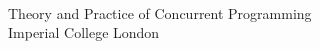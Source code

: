 
\begin{titlepage}


    \begin{flushright}
         \\
        \vspace{4mm}
        \moduletitlefont Theory and Practice of Concurrent Programming \\
        \vspace{1mm}
        \imperialfont Imperial College London
    \end{flushright}
\end{titlepage}


